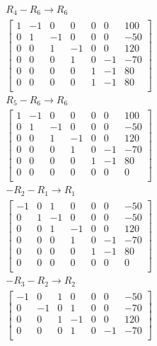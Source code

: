 \documentclass[12pt letter openany]{report}
\begin{document}
\begin{align*}
  R_4 - R_6  \rightarrow R_6      \\
  \begin{bmatrix}
    1 & -1 & 0  & 0  & 0 & 0  & 100 \\
    0 & 1  & -1 & 0  & 0 & 0  & -50 \\
    0 & 0  & 1  & -1 & 0 & 0  & 120 \\
    0 & 0  & 0  & 1  & 0 & -1 & -70 \\
    0 & 0  & 0  & 0  & 1 & -1 & 80  \\
    0 & 0  & 0  & 0  & 1 & -1 & 80  \\
  \end{bmatrix}
  \\
  R_5 - R_6  \rightarrow R_6      \\
  \begin{bmatrix}
    1 & -1 & 0  & 0  & 0 & 0  & 100 \\
    0 & 1  & -1 & 0  & 0 & 0  & -50 \\
    0 & 0  & 1  & -1 & 0 & 0  & 120 \\
    0 & 0  & 0  & 1  & 0 & -1 & -70 \\
    0 & 0  & 0  & 0  & 1 & -1 & 80  \\
    0 & 0  & 0  & 0  & 0 & 0  & 0   \\
  \end{bmatrix}
  \\
  -R_2 - R_1  \rightarrow R_1     \\
  \begin{bmatrix}
    -1 & 0 & 1  & 0  & 0 & 0  & -50 \\
    0  & 1 & -1 & 0  & 0 & 0  & -50 \\
    0  & 0 & 1  & -1 & 0 & 0  & 120 \\
    0  & 0 & 0  & 1  & 0 & -1 & -70 \\
    0  & 0 & 0  & 0  & 1 & -1 & 80  \\
    0  & 0 & 0  & 0  & 0 & 0  & 0   \\
  \end{bmatrix}
  \\
  -R_3 - R_2  \rightarrow R_2     \\
  \begin{bmatrix}
    -1 & 0  & 1 & 0  & 0 & 0  & -50 \\
    0  & -1 & 0 & 1  & 0 & 0  & -70 \\
    0  & 0  & 1 & -1 & 0 & 0  & 120 \\
    0  & 0  & 0 & 1  & 0 & -1 & -70 \\

\end{bmatrix}
\end{align*}
\end{document}
